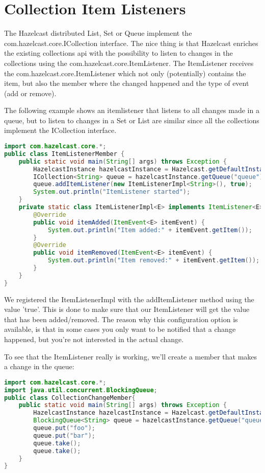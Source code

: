 \section{Collection Item Listeners}
The Hazelcast distributed List, Set or Queue implement the com.hazelcast.core.ICollection interface. The nice thing is that Hazelcast enriches the existing collections api with the possibility to listen to changes in the collections using the com.hazelcast.core.ItemListener. The ItemListener receives the com.hazelcast.core.ItemListener which not only (potentially) contains the item, but also the member where the changed happened and the type of event (add or remove).

The following example shows an itemlistener that listens to all changes made in a queue, but to listen to changes in a Set or List are similar since all the collections implement the ICollection interface.
\begin{lstlisting}[language=java]
import com.hazelcast.core.*;
public class ItemListenerMember {
    public static void main(String[] args) throws Exception {
        HazelcastInstance hazelcastInstance = Hazelcast.getDefaultInstance();
        ICollection<String> queue = hazelcastInstance.getQueue("queue");
        queue.addItemListener(new ItemListenerImpl<String>(), true);
        System.out.println("ItemListener started");
    }
    private static class ItemListenerImpl<E> implements ItemListener<E> {
        @Override
        public void itemAdded(ItemEvent<E> itemEvent) {
            System.out.println("Item added:" + itemEvent.getItem());
        }
        @Override
        public void itemRemoved(ItemEvent<E> itemEvent) {
            System.out.println("Item removed:" + itemEvent.getItem());
        }
    }
}
\end{lstlisting}
We registered the ItemListenerImpl with the addItemListener method using the value 'true'. This is done to make sure that our ItemListener will get the value that has been added/removed. The reason why this configuration option is available, is that in some cases you only want to be notified that a change happened, but you're not interested in the actual change.

To see that the ItemListener really is working, we'll create a member that makes a change in the queue:
\begin{lstlisting}[language=java]
import com.hazelcast.core.*;
import java.util.concurrent.BlockingQueue;
public class CollectionChangeMember{
    public static void main(String[] args) throws Exception {
        HazelcastInstance hazelcastInstance = Hazelcast.getDefaultInstance();
        BlockingQueue<String> queue = hazelcastInstance.getQueue("queue");
        queue.put("foo");
        queue.put("bar");
        queue.take();
        queue.take();
    }
}
\end{lstlisting}

